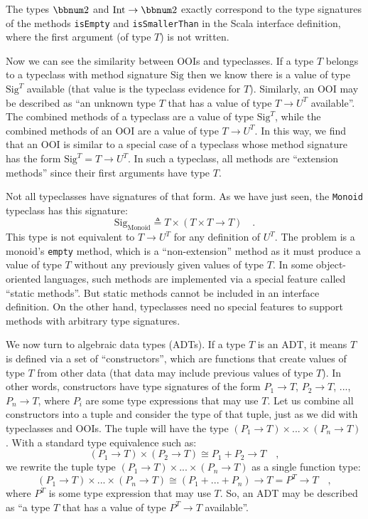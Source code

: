 The types $\bbnum 2$ and $\text{Int}\rightarrow\bbnum 2$ exactly
correspond to the type signatures of the methods \lstinline!isEmpty!
and \lstinline!isSmallerThan! in the Scala interface definition,
where the first argument (of type $T$) is not written.

Now we can see the similarity between OOIs and typeclasses. If a type
$T$ belongs to a typeclass with method signature $\text{Sig}$ then
we know there is a value of type $\text{Sig}^{T}$ available (that
value is the typeclass evidence for $T$). Similarly, an OOI may be
described as \textsf{``}an unknown type $T$ that has a value of type $T\rightarrow U^{T}$
available\textsf{''}. The combined methods of a typeclass are a value of type
$\text{Sig}^{T}$, while the combined methods of an OOI are a value
of type $T\rightarrow U^{T}$. In this way, we find that an OOI is
similar to a special case of a typeclass whose method signature has
the form $\text{Sig}^{T}=T\rightarrow U^{T}$. In such a typeclass,
all methods are \textsf{``}extension methods\textsf{''} since their first arguments
have type $T$.

Not all typeclasses have signatures of that form. As we have just
seen, the \lstinline!Monoid! typeclass has this signature: 
\[
\text{Sig}_{\text{Monoid}}\triangleq T\times(T\times T\rightarrow T)\quad.
\]
This type is not equivalent to $T\rightarrow U^{T}$ for any definition
of $U^{T}$. The problem is a monoid\textsf{'}s \lstinline!empty! method,
which is a \textsf{``}non-extension\textsf{''} method as it must produce a value of
type $T$ without any previously given values of type $T$. In some
object-oriented languages, such methods are implemented via a special
feature called \textsf{``}static methods\textsf{''}. But static methods cannot be
included in an interface definition. On the other hand, typeclasses
need no special features to support methods with arbitrary type signatures.

We now turn to algebraic data types (ADTs).
If a type $T$ is an ADT, it means $T$ is defined via a set of \textsf{``}constructors\textsf{''},
which are functions that create values of type $T$ from other data
(that data may include previous values of type $T$). In other words,
constructors have type signatures of the form $P_{1}\rightarrow T$,
$P_{2}\rightarrow T$, ..., $P_{n}\rightarrow T$, where $P_{i}$
are some type expressions that may use $T$. Let us combine all constructors
into a tuple and consider the type of that tuple, just as we did with
typeclasses and OOIs. The tuple will have the type $(P_{1}\rightarrow T)\times...\times(P_{n}\rightarrow T)$.
With a standard type equivalence such as:
\[
(P_{1}\rightarrow T)\times(P_{2}\rightarrow T)\cong P_{1}+P_{2}\rightarrow T\quad,
\]
we rewrite the tuple type $(P_{1}\rightarrow T)\times...\times(P_{n}\rightarrow T)$
as a single function type:
\[
(P_{1}\rightarrow T)\times...\times(P_{n}\rightarrow T)\cong(P_{1}+...+P_{n})\rightarrow T=P^{T}\rightarrow T\quad,
\]
where $P^{T}$ is some type expression that may use $T$. So, an ADT
may be described as \textsf{``}a type $T$ that has a value of type $P^{T}\rightarrow T$
available\textsf{''}. 

